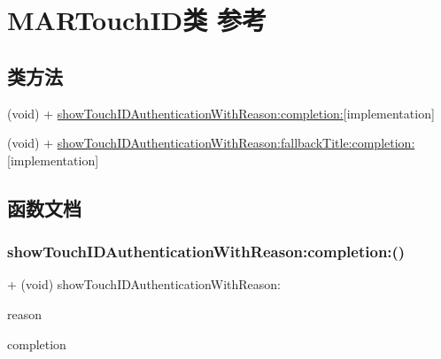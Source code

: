 \hypertarget{class_m_a_r_touch_i_d}{}\section{M\+A\+R\+Touch\+I\+D类 参考}
\label{class_m_a_r_touch_i_d}
\subsection*{类方法}
\begin{DoxyCompactItemize}
\item 
(void) + \hyperlink{class_m_a_r_touch_i_d_ad47911db6927aaf50e83be59db964105}{show\+Touch\+I\+D\+Authentication\+With\+Reason\+:completion\+:}{\ttfamily  \mbox{[}implementation\mbox{]}}
\item 
(void) + \hyperlink{class_m_a_r_touch_i_d_a0e505448389e6bccea0bd5fc6bf9e744}{show\+Touch\+I\+D\+Authentication\+With\+Reason\+:fallback\+Title\+:completion\+:}{\ttfamily  \mbox{[}implementation\mbox{]}}
\end{DoxyCompactItemize}


\subsection{函数文档}
\mbox{\label{class_m_a_r_touch_i_d_ad47911db6927aaf50e83be59db964105}} 
\subsubsection{\texorpdfstring{show\+Touch\+I\+D\+Authentication\+With\+Reason\+:completion\+:()}{showTouchIDAuthenticationWithReason:completion:()}}
{\footnotesize\ttfamily + (void) show\+Touch\+I\+D\+Authentication\+With\+Reason\+: \begin{DoxyParamCaption}\item[{(N\+S\+String $\ast$ \+\_\+\+Nonnull)}]{reason }\item[{completion:(void($^\wedge$ \+\_\+\+Nullable)(M\+A\+R\+Touch\+I\+D\+Result result))}]{completion }\end{DoxyParamCaption}\hspace{0.3cm}{\ttfamily [implementation]}}

